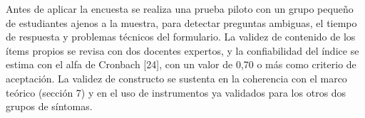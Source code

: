 Antes de aplicar la encuesta se realiza una prueba piloto con un grupo pequeño de
estudiantes ajenos a la muestra, para detectar preguntas ambiguas, el tiempo de respuesta y
problemas técnicos del formulario. La validez de contenido de los ítems propios se revisa
con dos docentes expertos, y la confiabilidad del índice se estima con el alfa de Cronbach
[24], con un valor de 0,70 o más como criterio de aceptación. La validez de constructo
se sustenta en la coherencia con el marco teórico (sección 7) y en el uso de instrumentos
ya validados para los otros dos grupos de síntomas.

